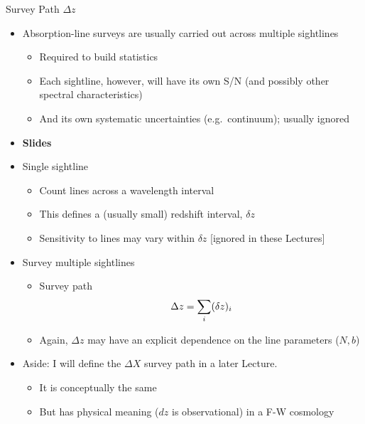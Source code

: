\documentclass[12pt,letterpaper]{article}
\begin{document}
\begin{Aenumerate}
{\bf \item Survey Path $\Delta z$}
 \begin{itemize}
 \item Absorption-line surveys are usually carried out across multiple sightlines
 	\begin{itemize}
	 \item Required to build statistics
	 \item Each sightline, however, will have its own S/N (and possibly other
	 spectral characteristics)
	 \item And its own systematic uncertainties (e.g.\ continuum); usually
	 ignored
	 \end{itemize}
 \item {\bf Slides}
 \item Single sightline
	 \begin{itemize}
	 \item Count lines across a wavelength interval
	 \item This defines a (usually small) redshift interval, $\delta z$
	 \item Sensitivity to lines may vary within $\delta z$ [ignored in 
	 these Lectures]
	 \end{itemize}
 \item Survey multiple sightlines
	 \begin{itemize}
	 \item Survey path
	 \begin{equation}
	 \Delta z = \sum\limits_i (\delta z)_i
	 \end{equation}
	 \item Again, $\Delta z$ may have an explicit dependence on the line 
	 parameters ($N, b$)
	 \end{itemize}
 \item Aside:  I will define the $\Delta X$ survey path in a later Lecture.
 	\begin{itemize}
	\item It is conceptually the same
	\item But has physical meaning ($dz$ is observational)
	in a F-W cosmology
 	\end{itemize}
 \end{itemize}


\end{Aenumerate}
\end{document}
